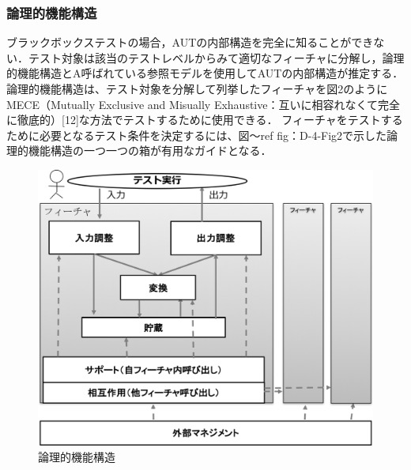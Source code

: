 \documentclass[a4paper,12pt]{jreport}
\begin{document}
\subsubsection{論理的機能構造}

ブラックボックステストの場合，AUTの内部構造を完全に知ることができない．テスト対象は該当のテストレベルからみて適切なフィーチャに分解し，論理的機能構造とA呼ばれている参照モデルを使用してAUTの内部構造が推定する． 論理的機能構造は、テスト対象を分解して列挙したフィーチャを図2のようにMECE（Mutually Exclusive and Misually Exhaustive：互いに相容れなくて完全に徹底的）[12]な方法でテストするために使用できる． フィーチャをテストするために必要となるテスト条件を決定するには、図〜ref {fig：D-4-Fig2}で示した論理的機能構造の一つ一つの箱が有用なガイドとなる．

\begin{figure}[h]
  \begin{center}
  \includegraphics[width=12cm]{./image/D-3-Fig3.png}
  \caption{論理的機能構造}
  \label{fig:D-4-Fig2}
  \end{center}
   \end{figure}
\end{document}

